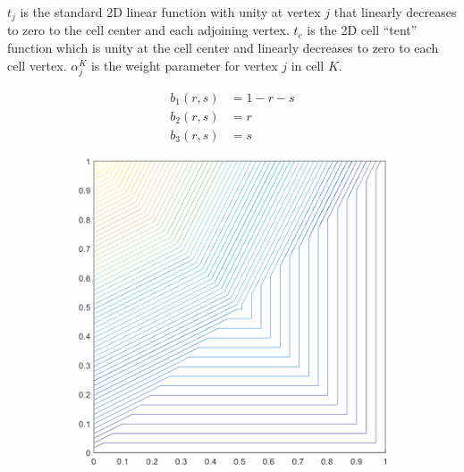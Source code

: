 \noindent $t_j$ is the standard 2D linear function with unity at vertex $j$ that linearly decreases to zero to the cell center and each adjoining vertex. $t_c$ is the 2D cell ``tent'' function which is unity at the cell center and linearly decreases to zero to each cell vertex. $\alpha_{j}^{K}$ is the weight parameter for vertex $j$ in cell $K$. 

\begin{equation}
\label{eq::2D_tri_ref_BF}
\begin{aligned}
	b_1(r,s) & = 1-r-s \\
	b_2(r,s) & = r \\
	b_3(r,s) & = s 
\end{aligned}
\end{equation}

\begin{figure}
\label{fig::2D_PWLD1_unit_square_basis_functions}
\centering
	\begin{subfigure}[b]{0.39\textwidth}
		\centering
		\includegraphics[width=\textwidth]{figures/sec_BF/square_PWLD1_contour_b4.png}
		\caption{}
	\end{subfigure}
	\hspace{1.5cm}
	\begin{subfigure}[b]{0.39\textwidth}
		\centering

\end{subfigure}
\end{figure}
